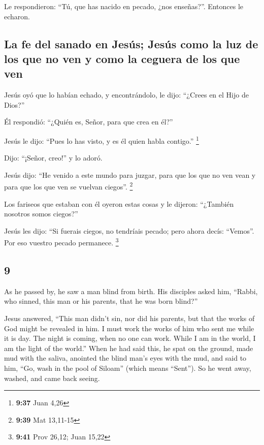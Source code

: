 \begin{paracol}{2}
 Le respondieron: ``Tú, que has nacido en pecado, ¿nos
enseñas?''. Entonces le echaron.

\hypertarget{la-fe-del-sanado-en-jesuxfas-jesuxfas-como-la-luz-de-los-que-no-ven-y-como-la-ceguera-de-los-que-ven}{%
\subsection{La fe del sanado en Jesús; Jesús como la luz de los que no
ven y como la ceguera de los que
ven}\label{la-fe-del-sanado-en-jesuxfas-jesuxfas-como-la-luz-de-los-que-no-ven-y-como-la-ceguera-de-los-que-ven}}

 Jesús oyó que lo habían echado, y encontrándolo, le
dijo: ``¿Crees en el Hijo de Dios?''

 Él respondió: ``¿Quién es, Señor, para que crea en él?''

 Jesús le dijo: ``Pues lo has visto, y es él quien habla
contigo.'' \footnote{\textbf{9:37} Juan 4,26}

 Dijo: ``¡Señor, creo!'' y lo adoró.

 Jesús dijo: ``He venido a este mundo para juzgar, para
que los que no ven vean y para que los que ven se vuelvan ciegos''.
\footnote{\textbf{9:39} Mat 13,11-15}

 Los fariseos que estaban con él oyeron estas cosas y le
dijeron: ``¿También nosotros somos ciegos?''

 Jesús les dijo: ``Si fuerais ciegos, no tendríais
pecado; pero ahora decís: ``Vemos''. Por eso vuestro pecado permanece.
\footnote{\textbf{9:41} Prov 26,12; Juan 15,22}

\switchcolumn
\begin{otherlanguage}{english}

\hypertarget{section-17}{%
\section{9}\label{section-17}}

 As he passed by, he saw a man blind from birth.
 His disciples asked him, ``Rabbi, who sinned, this man or
his parents, that he was born blind?''

 Jesus answered, ``This man didn't sin, nor did his
parents, but that the works of God might be revealed in him.
 I must work the works of him who sent me while it is day.
The night is coming, when no one can work.  While I am in
the world, I am the light of the world.''  When he had
said this, he spat on the ground, made mud with the saliva, anointed the
blind man's eyes with the mud,  and said to him, ``Go,
wash in the pool of Siloam'' (which means ``Sent''). So he went away,
washed, and came back seeing.


\end{otherlanguage}
\end{paracol}
